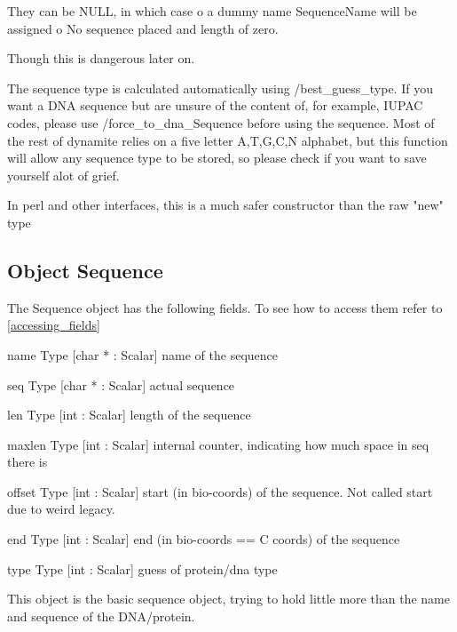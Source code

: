 They can be NULL, in which case 
o  a dummy name SequenceName will be assigned
o  No sequence placed and length of zero.


Though this is dangerous later on. 


The sequence type is calculated automatically using
/best_guess_type. If you want a DNA sequence but are
unsure of the content of, for example, IUPAC codes,
please use /force_to_dna_Sequence before using the
sequence. Most of the rest of dynamite relies on a
five letter A,T,G,C,N alphabet, but this function
will allow any sequence type to be stored, so please
check if you want to save yourself alot of grief.


In perl and other interfaces, this is a much safer
constructor than the raw "new" type




\subsection{Object Sequence}

\label{object_Sequence}

The Sequence object has the following fields. To see how to access them refer to \ref{accessing_fields}
\begin{description}
\item{name} Type [char * : Scalar]  name of the sequence

\item{seq} Type [char * : Scalar]  actual sequence

\item{len} Type [int : Scalar]  length of the sequence

\item{maxlen} Type [int : Scalar]  internal counter, indicating how much space in seq there is

\item{offset} Type [int : Scalar]  start (in bio-coords) of the sequence. Not called start due to weird legacy.

\item{end} Type [int : Scalar]  end (in bio-coords == C coords) of the sequence

\item{type} Type [int : Scalar]  guess of protein/dna type

\end{description}
This object is the basic sequence object,
trying to hold little more than the 
name and sequence of the DNA/protein. 


